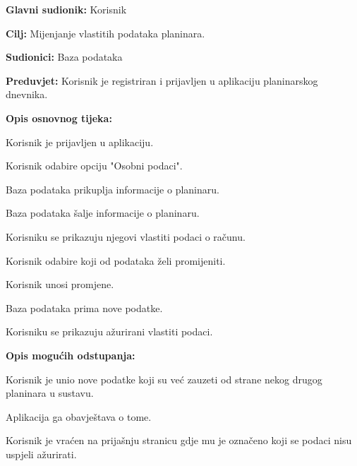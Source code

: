 		
		
		\noindent {}
		\begin{packed_item}
			
			\item \textbf{Glavni sudionik: } Korisnik
			\item  \textbf{Cilj:} Mijenjanje vlastitih podataka planinara.
			\item  \textbf{Sudionici:} Baza podataka
			\item  \textbf{Preduvjet:} Korisnik je registriran i prijavljen u aplikaciju planinarskog dnevnika.
			\item  \textbf{Opis osnovnog tijeka:}
			
			\item[] \begin{packed_enum}
				
				\item Korisnik je prijavljen u aplikaciju.
				\item Korisnik odabire opciju "Osobni podaci".
				\item Baza podataka prikuplja informacije o planinaru.
				\item Baza podataka šalje informacije o planinaru.
				\item Korisniku se prikazuju njegovi vlastiti podaci o računu.
				\item Korisnik odabire koji od podataka želi promijeniti.
				\item Korisnik unosi promjene.
				\item Baza podataka prima nove podatke.
				\item Korisniku se prikazuju ažurirani vlastiti podaci.
				
			\end{packed_enum}
			
			\item	\textbf{Opis mogućih odstupanja:}
			
			\item[] \begin{packed_item}
				
				\item[9.a] Korisnik je unio nove podatke koji su već zauzeti od strane nekog drugog planinara u sustavu.
				\item[] \begin{packed_enum}
					
					\item Aplikacija ga obavještava o tome.
					\item Korisnik je vraćen na prijašnju stranicu gdje mu je označeno koji se podaci nisu uspjeli ažurirati.
				\end{packed_enum}
				
			\end{packed_item}
		\end{packed_item}
		
